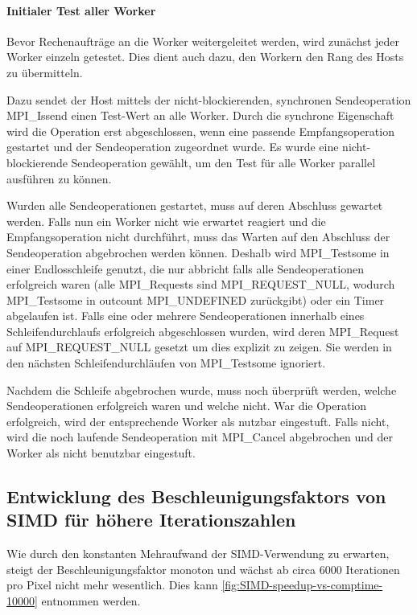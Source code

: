 \paragraph{Initialer Test aller Worker}\label{para:init_worker_test}

Bevor Rechenaufträge an die Worker weitergeleitet werden, wird zunächst jeder Worker einzeln getestet.
Dies dient auch dazu, den Workern den Rang des Hosts zu übermitteln.

Dazu sendet der Host mittels der nicht-blockierenden, synchronen Sendeoperation MPI\_Issend einen Test-Wert an alle Worker.
Durch die synchrone Eigenschaft wird die Operation erst abgeschlossen, wenn eine passende Empfangsoperation gestartet und der Sendeoperation zugeordnet wurde.
Es wurde eine nicht-blockierende Sendeoperation gewählt, um den Test für alle Worker parallel ausführen zu können.

Wurden alle Sendeoperationen gestartet, muss auf deren Abschluss gewartet werden.
Falls nun ein Worker nicht wie erwartet reagiert und die Empfangsoperation nicht durchführt, muss das Warten auf den Abschluss der Sendeoperation abgebrochen werden können.
Deshalb wird MPI\_Testsome in einer Endlosschleife genutzt, die nur abbricht falls alle Sendeoperationen erfolgreich waren (alle MPI\_Requests sind MPI\_REQUEST\_NULL, wodurch MPI\_Testsome in outcount MPI\_UNDEFINED zurückgibt) oder ein Timer abgelaufen ist.
Falls eine oder mehrere Sendeoperationen innerhalb eines Schleifendurchlaufs erfolgreich abgeschlossen wurden, wird deren MPI\_Request auf MPI\_REQUEST\_NULL gesetzt um dies explizit zu zeigen.
Sie werden in den nächsten Schleifendurchläufen von MPI\_Testsome ignoriert.

Nachdem die Schleife abgebrochen wurde, muss noch überprüft werden, welche Sendeoperationen erfolgreich waren und welche nicht.
War die Operation erfolgreich, wird der entsprechende Worker als nutzbar eingestuft.
Falls nicht, wird die noch laufende Sendeoperation mit MPI\_Cancel abgebrochen und der Worker als nicht benutzbar eingestuft.

\subsection{Entwicklung des Beschleunigungsfaktors von SIMD für höhere Iterationszahlen}
\label{par:SIMD-speedup-entwicklung}

Wie durch den konstanten Mehraufwand der SIMD-Verwendung zu erwarten, steigt der Beschleunigungsfaktor
monoton und wächst ab circa 6000 Iterationen pro Pixel nicht mehr wesentlich.
Dies kann \autoref{fig:SIMD-speedup-vs-comptime-10000} entnommen werden.

